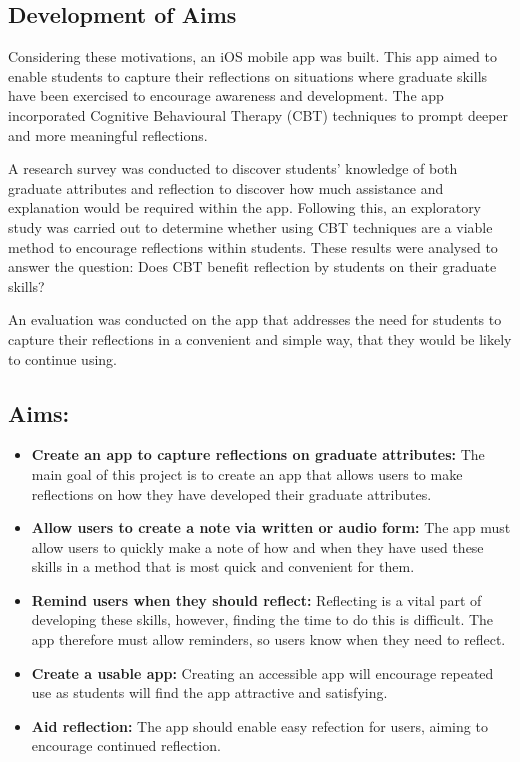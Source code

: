 \documentclass{l4proj}
\begin{document}
\subsection{Development of Aims}

Considering these motivations, an iOS mobile app was built.  This app aimed to enable students to capture their reflections on situations where graduate skills have been exercised to encourage awareness and development. The app incorporated Cognitive Behavioural Therapy (CBT) techniques to prompt deeper and more meaningful reflections. 

A research survey was conducted to discover students' knowledge of both graduate attributes and reflection to discover how much assistance and explanation would be required within the app. Following this, an exploratory study was carried out to determine whether using CBT techniques are a viable method to encourage reflections within students. These results were analysed to answer the question: Does CBT benefit reflection by students on their graduate skills?

An evaluation was conducted on the app that addresses the need for students to capture their reflections in a convenient and simple way, that they would be likely to continue using.

\subsection{Aims:}

\begin{itemize}
    \item \textbf{Create an app to capture reflections on graduate attributes:} The main goal of this project is to create an app that allows users to make reflections on how they have developed their graduate attributes.
    \item \textbf{Allow users to create a note via written or audio form:} The app must allow users to quickly make a note of how and when they have used these skills in a method that is most quick and convenient for them.
    \item \textbf{Remind users when they should reflect:} Reflecting is a vital part of developing these skills, however, finding the time to do this is difficult. The app therefore must allow reminders, so users know when they need to reflect.
    \item \textbf{Create a usable app:} Creating an accessible app will encourage repeated use as students will find the app attractive and satisfying.
    \item \textbf{Aid reflection:} The app should enable easy refection for users, aiming to encourage continued reflection.
\end{itemize}
\end{document}
